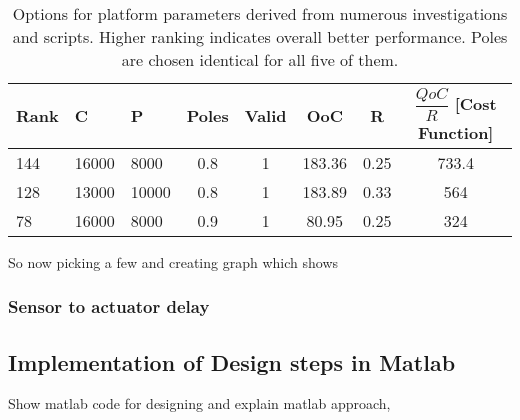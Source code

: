 \begin{enumerate}
	\begin{table}[htbp]
		\centering
		\caption{Options for platform parameters derived from numerous investigations and scripts. Higher ranking indicates overall better performance. Poles are chosen identical for all five of them.}
		\begin{tabular}{lllccccc}
			\toprule
			Rank & C& P & Poles &Valid &OoC & R & $\dfrac{QoC}{R}$ [Cost Function] \\ 
		\midrule
		144 & 16000 & 8000 & 0.8 & 1 & 183.36 & 0.25 & 733.4 \\ 
		128 & 13000 & 10000 & 0.8 & 1 & 183.89 & 0.33 & 564 \\ 
		78 & 16000 & 8000 & 0.9 & 1 & 80.95 & 0.25 & 324 \\ 
	\midrule
	\end{tabular}
	\label{tab:list}
	
	
	
	\item So now picking a few and creating graph which shows
\end{table}

\end{enumerate}

\subsubsection{Sensor to actuator delay}
\label{sec:stad}

\subsection{Implementation of Design steps in Matlab}
\color{red}
Show matlab code for designing and explain matlab approach,
\color{black}